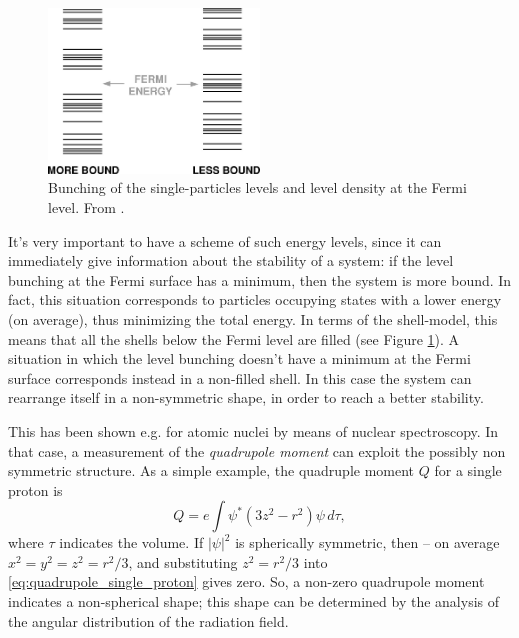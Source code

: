 \documentclass[a4paper,twoside,11pt]{book}
\begin{document}
\begin{figure}[H]
	\centering
    \includegraphics[width=0.5\textwidth]{Figure_1_Reimann}
    \caption{Bunching of the single-particles levels and level density at the Fermi level. From \cite{Reimann2002}.}
	\label{fig:Figure_1_Reimann}
\end{figure}

It's very important to have a scheme of such energy levels, since it can immediately give information about the stability of a system: if the level bunching at the Fermi surface has a minimum, then the system is more bound. In fact, this situation corresponds to particles occupying states with a lower energy (on average), thus minimizing the total energy. In terms of the shell-model, this means that all the shells below the Fermi level are filled (see Figure \ref{fig:Figure_1_Reimann}). A situation in which the level bunching doesn't have a minimum at the Fermi surface corresponds instead in a non-filled shell. In this case the system can rearrange itself in a non-symmetric shape, in order to reach a better stability.

This has been shown e.g. for atomic nuclei by means of nuclear spectroscopy. In that case, a measurement of the \emph{quadrupole moment} can exploit the possibly non symmetric structure. As a simple example, the quadruple moment $Q$ for a single proton is
\begin{equation}
	Q = e \int \psi^*(3z^2-r^2)\psi\,d\tau,
	\label{eq:quadrupole_single_proton}
\end{equation}
where $\tau$ indicates the volume. If $|\psi|^2$ is spherically symmetric, then -- on average $x^2=y^2=z^2=r^2/3$, and substituting $z^2=r^2/3$ into \eqref{eq:quadrupole_single_proton} gives zero. So, a non-zero quadrupole moment indicates a non-spherical shape; this shape can be determined by the analysis of the angular distribution of the radiation field.
\end{document}
